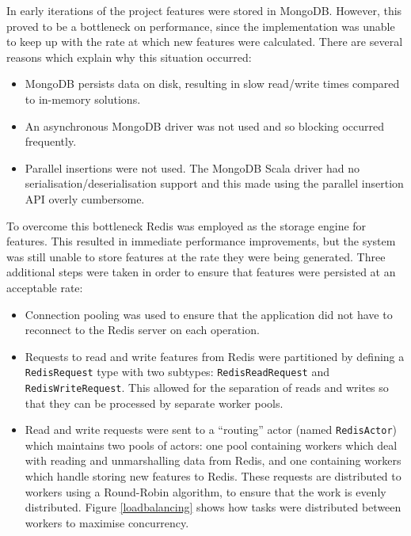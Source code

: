 \documentclass{l4proj}
\newcommand{\code}[1]{\texttt{#1}}
\begin{document}
        In early iterations of the project features were stored in MongoDB. However, this proved to be a bottleneck on performance, since the implementation was unable to keep up with the rate at which new features were calculated. There are several reasons which explain why this situation occurred:
        
        \begin{itemize}
        \item MongoDB persists data on disk, resulting in slow read/write times compared to in-memory solutions.
        \item An asynchronous MongoDB driver was not used and so blocking occurred frequently.
        \item Parallel insertions were not used. The MongoDB Scala driver had no serialisation/deserialisation support and this made using the parallel insertion API overly cumbersome.
        \end{itemize}
        
        To overcome this bottleneck Redis was employed as the storage engine for features. This resulted in immediate performance improvements, but the system was still unable to store features at the rate they were being generated. Three additional steps were taken in order to ensure that features were persisted at an acceptable rate:
        
        \begin{itemize}
        \item Connection pooling was used to ensure that the application did not have to reconnect to the Redis server on each operation.
        \item Requests to read and write features from Redis were partitioned by defining a \code{RedisRequest} type with two subtypes: \code{RedisReadRequest} and \code{RedisWriteRequest}. This allowed for the separation of reads and writes so that they can be processed by separate worker pools.
        \item Read and write requests were sent to a ``routing'' actor (named \code{RedisActor}) which maintains two pools of actors: one pool containing workers which deal with reading and unmarshalling data from Redis, and one containing workers which handle storing new features to Redis. These requests are distributed to workers using a Round-Robin algorithm, to ensure that the work is evenly distributed. Figure \ref{loadbalancing} shows how tasks were distributed between workers to maximise concurrency.
        \end{itemize}
\end{document}
